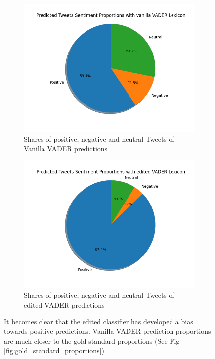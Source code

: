 \documentclass[11pt]{article}
\begin{document}
\restoregeometry     %

\begin{figure}[H]
     \centering
     \begin{subfigure}[b]{0.45\textwidth}
         \centering
         \includegraphics[width=\textwidth]{figures/predicted_sentiment_proportions_vanilla.png}
         \caption{Shares of positive, negative and neutral Tweets of Vanilla VADER predictions}
         \label{vanilla_pie}
     \end{subfigure}
     \hfill 
     \begin{subfigure}[b]{0.45\textwidth}
         \centering
         \includegraphics[width=\textwidth]{figures/predicted_sentiment_proportions_edited.png}
         \caption{Shares of positive, negative and neutral Tweets of edited VADER predictions}
         \label{edit_pie}
     \end{subfigure}
        \caption{It becomes clear that the edited classifier has developed a bias towards positive predictions. Vanilla VADER prediction proportions are much closer to the gold standard proportions (See Fig \ref{fig:gold_standard_proportions})}
        \label{fig:vader_piechart_comparison}
\end{figure}
\end{document}
